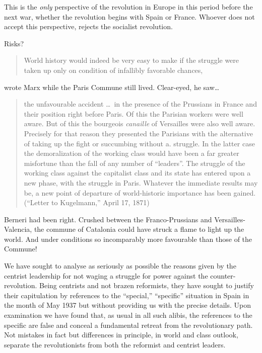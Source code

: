 This is the \emph{only} perspective of the revolution in Europe in this period before the next war, whether the revolution begins with Spain or France. Whoever does not accept this perspective, rejects the socialist revolution.

Risks?

\begin{quotation}
  World history would indeed be very easy to make if the struggle were taken up only on condition of infallibly favorable chances,  
\end{quotation}
wrote Marx while the Paris Commune still lived.
Clear-eyed, he saw\dots
\nowidow

\begin{quotation}
  the unfavourable accident \dots\ in the presence of the Prussians in France and their position right before Paris. Of this the Parisian workers were well aware. But of this the bourgeois \emph{canaille} of Versailles were also well aware. Precisely for that reason they presented the Parisians with the alternative of taking up the fight or succumbing without a. struggle. In the latter case the demoralization of the working class would have been a far greater misfortune than the fall of any number of “leaders”. The struggle of the working class against the capitalist class and its state has entered upon a new phase, with the struggle in Paris. Whatever the immediate results may be, a new point of departure of world-historic importance has been gained. (``Letter to Kugelmann,'' April 17, 1871)
\end{quotation}

Berneri had been right. Crushed between the Franco-Prussians and Versailles-Valencia, the commune of Catalonia could have struck a flame to light up the world. And under conditions so incomparably more favourable than those of the Commune!

We have sought to analyse as seriously as possible the reasons given by the centrist leadership for not waging a struggle for power against the counter-revolution. Being centrists and not brazen reformists, they have sought to justify their capitulation by references to the ``special,'' ``specific'' situation in Spain in the month of May 1937 but without providing us with the precise details. Upon examination we have found that, as usual in all such alibis, the references to the specific are false and conceal a fundamental retreat from the revolutionary path. Not mistakes in fact but differences in principle, in world and class outlook, separate the revolutionists from both the reformist and centrist leaders.


